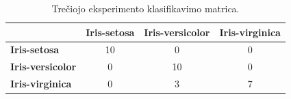 \begin{table}[H]
    \centering
    \caption{Trečiojo eksperimento klasifikavimo matrica.}
    \begin{tabular}{|l|c|c|c|}
        \hline
        & \textbf{Iris-setosa} & \textbf{Iris-versicolor} & \textbf{Iris-virginica} \\
        \hline
        \textbf{Iris-setosa} & 10 & 0 & 0 \\ \hline
        \textbf{Iris-versicolor} & 0 & 10 & 0 \\ \hline
        \textbf{Iris-virginica} & 0 & 3 & 7 \\ \hline
    \end{tabular}
    \label{tab:eksperimento_nr_3_klasifikavimo_matrica}
\end{table}